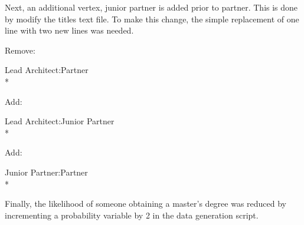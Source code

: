 \noindent Next, an additional vertex, junior partner is added prior to partner. 
This is done by modify the titles text file.  To make this change, the simple
replacement of one line with two new lines was needed.
	
	\begin{footnotesize}
	\indent Remove: \begin{tt}Lead Architect:Partner\\*\end{tt}
	\indent Add: \begin{tt}Lead Architect:Junior Partner\\*\end{tt}
	\indent Add: \begin{tt}Junior Partner:Partner\\*\end{tt}
	\end{footnotesize}
	
\noindent Finally, the likelihood of someone obtaining a master's degree was
reduced by incrementing a probability variable by 2 in the data generation
script.



\usetikzlibrary{shapes,arrows,chains,decorations.markings}

